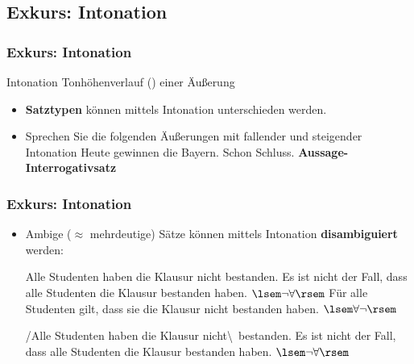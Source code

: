 \subsection{Exkurs: Intonation}

\begin{frame}
\frametitle{Exkurs: Intonation}

\begin{block}{Intonation}
Tonhöhenverlauf () einer Äußerung
\end{block}

\begin{itemize}
	\item \textbf{Satztypen} können mittels Intonation unterschieden werden.
	
	\item Sprechen Sie die folgenden Äußerungen mit fallender und steigender Intonation
	\eal 
	\ex Heute gewinnen die Bayern.
	\ex Schon Schluss.
        \zl
\pause
	\textbf{Aussage-} \vs \textbf{Interrogativsatz}	
	
\end{itemize}

\end{frame}




\begin{frame}
\frametitle{Exkurs: Intonation}

\begin{itemize}
	\item Ambige ($\approx$ mehrdeutige) Sätze können mittels Intonation  \textbf{disambiguiert} werden: 
	
	  \ea
          Alle Studenten haben die Klausur nicht bestanden.
          \z
        \eal
	\ex Es ist nicht der Fall, dass alle Studenten die Klausur bestanden haben. \hfill $\lsem \neg \forall \rsem$
	\ex Für alle Studenten gilt, dass sie die Klausur nicht bestanden haben. \hfill $\lsem \forall \neg \rsem$
        \zl
\pause 

\ea
/Alle Studenten haben die Klausur  nicht\textbackslash\ bestanden.
\z
\eal
\ex Es ist nicht der Fall, dass alle Studenten die Klausur bestanden haben. \hfill $\lsem \neg \forall \rsem$
	\zl

\end{itemize}

\end{frame}



